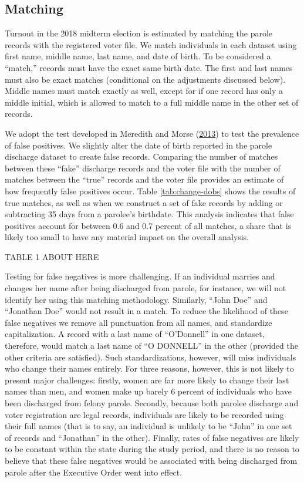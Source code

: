 \documentclass[
  12pt,
]{article}
\begin{document}
\hypertarget{matching}{%
\subsection*{Matching}\label{matching}}

Turnout in the 2018 midterm election is estimated by matching the parole records with the registered voter file. We match individuals in each dataset using first name, middle name, last name, and date of birth. To be considered a ``match,'' records must have the exact same birth date. The first and last names must also be exact matches (conditional on the adjustments discussed below). Middle names must match exactly as well, except for if one record has only a middle initial, which is allowed to match to a full middle name in the other set of records.

We adopt the test developed in Meredith and Morse (\protect\hyperlink{ref-Meredith2013}{2013}) to test the prevalence of false positives. We slightly alter the date of birth reported in the parole discharge dataset to create false records. Comparing the number of matches between these ``fake'' discharge records and the voter file with the number of matches between the ``true'' records and the voter file provides an estimate of how frequently false positives occur. Table \ref{tab:change-dobs} shows the results of true matches, as well as when we construct a set of fake records by adding or subtracting 35 days from a parolee's birthdate. This analysis indicates that false positives account for between 0.6 and 0.7 percent of all matches, a share that is likely too small to have any material impact on the overall analysis.

TABLE 1 ABOUT HERE

Testing for false negatives is more challenging. If an individual marries and changes her name after being discharged from parole, for instance, we will not identify her using this matching methodology. Similarly, ``John Doe'' and ``Jonathan Doe'' would not result in a match. To reduce the likelihood of these false negatives we remove all punctuation from all names, and standardize capitalization. A record with a last name of ``O'Donnell'' in one dataset, therefore, would match a last name of ``O DONNELL'' in the other (provided the other criteria are satisfied). Such standardizations, however, will miss individuals who change their names entirely. For three reasons, however, this is not likely to present major challenges: firstly, women are far more likely to change their last names than men, and women make up barely 6 percent of individuals who have been discharged from felony parole. Secondly, because both parolee discharge and voter registration are legal records, individuals are likely to be recorded using their full names (that is to say, an individual is unlikely to be ``John'' in one set of records and ``Jonathan'' in the other). Finally, rates of false negatives are likely to be constant within the state during the study period, and there is no reason to believe that these false negatives would be associated with being discharged from parole after the Executive Order went into effect.
\end{document}
